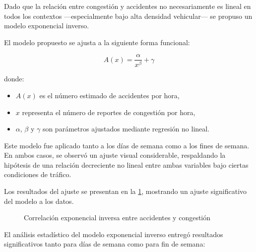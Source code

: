 \documentclass[12pt]{article}
\begin{document}
Dado que la relación entre congestión y accidentes no necesariamente es lineal en todos los contextos —especialmente bajo alta densidad vehicular— se propuso un modelo exponencial inverso.

El modelo propuesto se ajusta a la siguiente forma funcional:

\begin{equation}
A(x) = \frac{\alpha}{x^{\beta}} + \gamma
\end{equation}

donde:
\begin{itemize}
    \item $A(x)$ es el número estimado de accidentes por hora,
    \item $x$ representa el número de reportes de congestión por hora,
    \item $\alpha$, $\beta$ y $\gamma$ son parámetros ajustados mediante regresión no lineal.
\end{itemize}

Este modelo fue aplicado tanto a los días de semana como a los fines de semana. En ambos casos, se observó un ajuste visual considerable, respaldando la hipótesis de una relación decreciente no lineal entre ambas variables bajo ciertas condiciones de tráfico.

Los resultados del ajuste se presentan en la \cref{fig:corr_exp}, mostrando un ajuste significativo del modelo a los datos.

\begin{figure}[H]
    \centering
    \newline
    \newline
    \caption{Correlación exponencial inversa entre accidentes y congestión}
    \label{fig:corr_exp}
\end{figure}

El análisis estadístico del modelo exponencial inverso entregó resultados significativos tanto para días de semana como para fin de semana:
\end{document}
